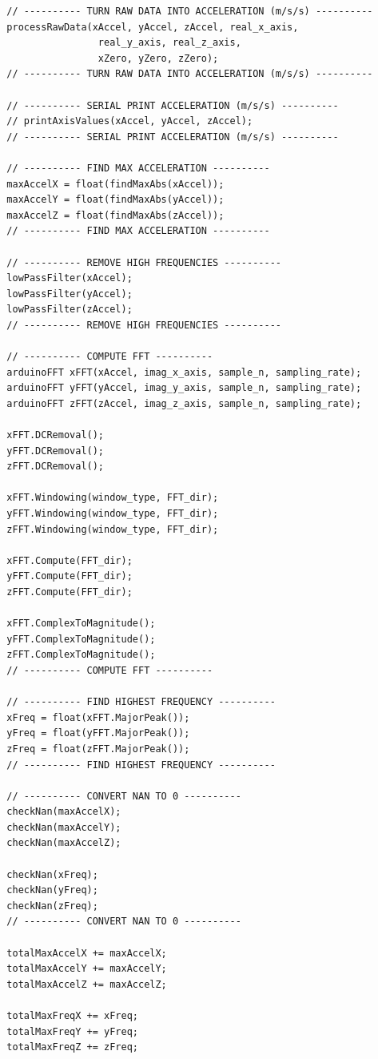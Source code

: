 \begin{verbatim}
  // ---------- TURN RAW DATA INTO ACCELERATION (m/s/s) ----------
  processRawData(xAccel, yAccel, zAccel, real_x_axis,
                  real_y_axis, real_z_axis,
                  xZero, yZero, zZero);
  // ---------- TURN RAW DATA INTO ACCELERATION (m/s/s) ----------

  // ---------- SERIAL PRINT ACCELERATION (m/s/s) ----------
  // printAxisValues(xAccel, yAccel, zAccel);
  // ---------- SERIAL PRINT ACCELERATION (m/s/s) ----------

  // ---------- FIND MAX ACCELERATION ----------
  maxAccelX = float(findMaxAbs(xAccel));
  maxAccelY = float(findMaxAbs(yAccel));
  maxAccelZ = float(findMaxAbs(zAccel));
  // ---------- FIND MAX ACCELERATION ----------

  // ---------- REMOVE HIGH FREQUENCIES ----------
  lowPassFilter(xAccel);
  lowPassFilter(yAccel);
  lowPassFilter(zAccel);
  // ---------- REMOVE HIGH FREQUENCIES ----------

  // ---------- COMPUTE FFT ----------
  arduinoFFT xFFT(xAccel, imag_x_axis, sample_n, sampling_rate);
  arduinoFFT yFFT(yAccel, imag_y_axis, sample_n, sampling_rate);
  arduinoFFT zFFT(zAccel, imag_z_axis, sample_n, sampling_rate);

  xFFT.DCRemoval();
  yFFT.DCRemoval();
  zFFT.DCRemoval();

  xFFT.Windowing(window_type, FFT_dir);
  yFFT.Windowing(window_type, FFT_dir);
  zFFT.Windowing(window_type, FFT_dir);

  xFFT.Compute(FFT_dir);
  yFFT.Compute(FFT_dir);
  zFFT.Compute(FFT_dir);

  xFFT.ComplexToMagnitude();
  yFFT.ComplexToMagnitude();
  zFFT.ComplexToMagnitude();
  // ---------- COMPUTE FFT ----------

  // ---------- FIND HIGHEST FREQUENCY ----------
  xFreq = float(xFFT.MajorPeak());
  yFreq = float(yFFT.MajorPeak());
  zFreq = float(zFFT.MajorPeak());
  // ---------- FIND HIGHEST FREQUENCY ----------

  // ---------- CONVERT NAN TO 0 ----------
  checkNan(maxAccelX);
  checkNan(maxAccelY);
  checkNan(maxAccelZ);

  checkNan(xFreq);
  checkNan(yFreq);
  checkNan(zFreq);
  // ---------- CONVERT NAN TO 0 ----------

  totalMaxAccelX += maxAccelX;
  totalMaxAccelY += maxAccelY;
  totalMaxAccelZ += maxAccelZ;

  totalMaxFreqX += xFreq;
  totalMaxFreqY += yFreq;
  totalMaxFreqZ += zFreq;


\end{verbatim}
